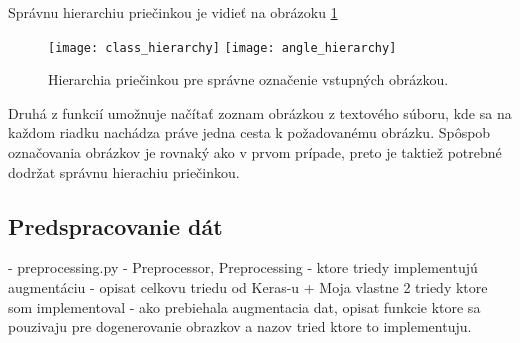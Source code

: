 Správnu hierarchiu priečinkou je vidieť na obrázoku \ref{pic:folderhierarchy}

\begin{figure}[H]
    \centering
    \texttt{[image: class\_hierarchy]}
    \qquad
    \texttt{[image: angle\_hierarchy]}
    \caption{Hierarchia priečinkou pre správne označenie vstupných obrázkou.}
    \label{pic:folderhierarchy}
\end{figure}

Druhá z funkcií umožnuje načítať zoznam obrázkou z textového súboru, kde sa na každom riadku nachádza práve jedna cesta k požadovanému obrázku.
Spôspob označovania obrázkov je rovnaký ako v prvom prípade, preto je taktiež potrebné dodržat správnu hierachiu priečinkou.

\subsection{Predspracovanie dát}
\label{subsec:predspracovaniedat}
- preprocessing.py - Preprocessor, Preprocessing
- ktore triedy implementujú augmentáciu
- opisat celkovu triedu od Keras-u + Moja vlastne 2 triedy ktore som implementoval
- ako prebiehala augmentacia dat, opisat funkcie ktore sa pouzivaju pre dogenerovanie obrazkov a nazov tried ktore to implementuju.
